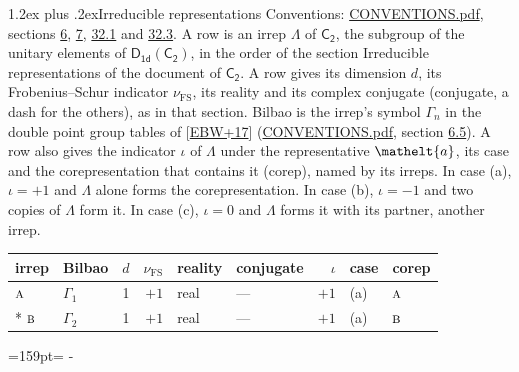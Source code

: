 \documentclass[10pt,a4paper]{article}
\makeatletter
\renewcommand\section{\@startsection{section}{1}{\z@}{-3ex plus -1ex minus -.2ex}%
  {1.2ex plus .2ex}{\normalfont\large\sffamily\bfseries\color{parttitle}}}
\newcommand{\needspace}[1]{\par\penalty-100\begingroup\dimen0=#1\relax\dimen2=\pagegoal
  \advance\dimen2-\pagetotal\ifdim\dimen0>\dimen2\relax\ifdim\dimen2>0pt\vfil\break\fi\fi
  \endgroup}
\numberwithin{equation}{section}
\newcommand{\eltfont}[1]{{\let\sigma\eltsigma\mathelt{#1}}}
\newcommand{\grp}[1]{\mathsf{#1}}
\newcommand{\irr}[1]{\text{\normalfont\scshape #1}}
\newcommand{\elt}[1]{\eltfont{#1}}
\newcommand{\fsind}{\nu_{\mathrm{FS}}}
\makeatother
\begin{document}
\section{Irreducible representations}\label{s:irreps}
Conventions: \href{../../CONVENTIONS.pdf}{CONVENTIONS.pdf}, sections \href{../../../rotation/CONVENTIONS.pdf\#conv.6}{6}, \href{../../../rotation/CONVENTIONS.pdf\#conv.7}{7}, \href{../../CONVENTIONS.pdf\#conv.32.1}{32.1} and \href{../../CONVENTIONS.pdf\#conv.32.3}{32.3}.
\leavevmode\label{n:irrep.Delta}A row is an irrep $\Lambda$ of $\grp{C_{2}}$, the subgroup of the unitary elements of $\grp{D_{1d}}(\grp{C_{2}})$, in the order of the section Irreducible representations of the document of \href{../../../rotation/data/pdf/C2.pdf}{$\grp{C_{2}}$}. \label{n:index.dimension}\label{n:index.frobenius}\label{n:head.irrep}\label{n:head.reality}\label{n:head.conjugate}A row gives its dimension $d$, its Frobenius--Schur indicator $\fsind$, its reality and its complex conjugate (conjugate, a dash for the others), as in that section. \label{n:head.bilbao}\label{n:irrep.alias.gamma}Bilbao is the irrep's symbol $\Gamma_n$ in the double point group tables of [\href{../../../REFERENCES.pdf\#ref.EBW+17}{EBW+17}] (\href{../../CONVENTIONS.pdf}{CONVENTIONS.pdf}, section \href{../../../rotation/CONVENTIONS.pdf\#conv.6.5}{6.5}). \label{n:head.case.corep}\label{n:head.corep}A row also gives the indicator $\iota$ of $\Lambda$ under the representative $\elt{a}$, its case and the corepresentation that contains it (corep), named by its irreps. In case (a), $\iota = +1$ and $\Lambda$ alone forms the corepresentation. In case (b), $\iota = -1$ and two copies of $\Lambda$ form it. In case (c), $\iota = 0$ and $\Lambda$ forms it with its partner, another irrep.
\setlength{\emergencystretch}{2em}\par\setlength{\emergencystretch}{0pt}
{\small\renewcommand{\arraystretch}{1.25}\setlength{\tabcolsep}{4pt}\begin{longtable}{@{}llrrllrll@{}}\toprule
irrep & Bilbao & $d$ & $\fsind$ & reality & conjugate & $\iota$ & case & corep\\\midrule\endhead
\bottomrule\endfoot\endlastfoot
$\irr{a}$ & $\Gamma_{1}$ & 1 & $+1$ & real & --- & $+1$ & (a) & $\irr{a}$\\*
$\irr{b}$ & $\Gamma_{2}$ & 1 & $+1$ & real & --- & $+1$ & (a) & $\irr{b}$\\
\bottomrule\end{longtable}}
\needspace{159pt}
\end{document}
